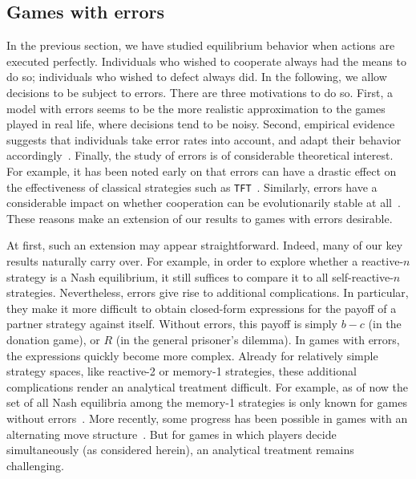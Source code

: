 \documentclass[9pt,twoside,lineno]{pnas-new}
\theoremstyle{plainCl1}
\theoremstyle{plainCl2}
\def\tft{\texttt{TFT}}
\begin{document}
 
 
 
 

\subsection{Games with errors}
\label{section:errors}

In the previous section, we have studied equilibrium behavior when actions are executed perfectly. 
Individuals who wished to cooperate always had the means to do so; individuals who wished to defect always did.
In the following, we allow decisions to be subject to errors.
There are three motivations to do so. 
First, a model with errors seems to be the more realistic approximation to the games played in real life, where decisions tend to be noisy. 
Second, empirical evidence suggests that individuals take error rates into account, and adapt their behavior accordingly~\cite{fudenberg:aer:2012,Arechar:GEB:2017}. 
Finally, the study of errors is of considerable theoretical interest. 
For example, it has been noted early on that errors can have a drastic effect on the effectiveness of classical strategies such as \tft{}~\citep{molander:jcr:1985, axelrod:Science:1988, wu:JCR:1995}. 
Similarly, errors have a considerable impact on whether cooperation can be evolutionarily stable at all~\citep{boyd:Nature:1987,boyd:JTB:1989,garcia:jet:2016}. 
These reasons make an extension of our results to games with errors desirable. 

At first, such an extension may appear straightforward. 
Indeed, many of our key results naturally carry over. 
For example, in order to explore whether a reactive-$n$ strategy is a Nash equilibrium, it still suffices to compare it to all self-reactive-$n$ strategies.
Nevertheless, errors give rise to additional complications. 
In particular, they make it more difficult to obtain closed-form expressions for the payoff of a partner strategy against itself. 
Without errors, this payoff is simply $b\!-\!c$ (in the donation game), or $R$ (in the general prisoner's dilemma). 
In games with errors, the expressions quickly become more complex. 
Already for relatively simple strategy spaces, like reactive-2 or memory-1 strategies, these additional complications render an analytical treatment difficult. 
For example, as of now the set of all Nash equilibria among the memory-1 strategies is only known for games without errors~\citep{akin:EGADS:2016,stewart:pnas:2014}. 
More recently, some progress has been possible in games with an alternating move structure~\citep{park:NComms:2022}. 
But for games in which players decide simultaneously (as considered herein), an analytical treatment remains challenging.
\end{document}
